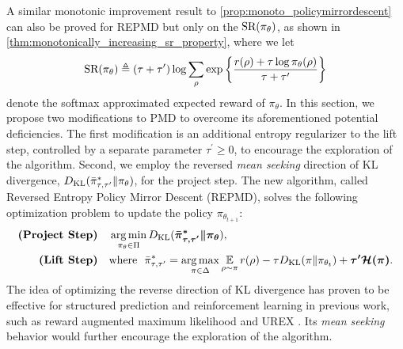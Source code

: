 A similar monotonic improvement result to \cref{prop:monoto_policymirrordescent} can also be proved for REPMD but only on the $\text{SR}(\pi_\theta) $, as shown in \cref{thm:monotonically_increasing_sr_property}, where we let
\begin{equation*}
\text{SR}(\pi_\theta) \triangleq (\tau + \tau^{\prime})\log{ \sum_{\rho}{ \exp\left\{ \frac{r(\rho) + \tau \log{\pi_\theta(\rho)} }{\tau + \tau^{\prime}} \right\} }}
\end{equation*}
denote the softmax approximated expected reward of $\pi_\theta$.
\fi
In this section, we propose two modifications to PMD to overcome its aforementioned potential deficiencies.
The first modification is an additional entropy regularizer to the lift step, controlled by a separate parameter $\tau^{\prime}\geq 0$, to encourage the exploration of the algorithm. 
Second, we employ the reversed \emph{mean seeking} direction of KL divergence, $D_{\mathrm{KL}}(\bar{\pi}_{\tau,\tau^{\prime}}^* \| \pi_\theta)$, for the project step.
The new algorithm, called Reversed Entropy Policy Mirror Descent (REPMD), solves the following optimization problem to update the policy $\pi_{\theta_{t+1}}$:
\begin{equation}
\label{eq:repmd}
\begin{split}
\text{\bf (Project Step)} \quad  &\argmin\limits_{\pi_\theta \in \Pi}{\KL(\bm{ \bar{\pi}_{\tau,\tau^{\prime}}^* \| \pi_\theta }) }, \\
\text{\bf (Lift Step)} \quad  & \text{where}\ \ \bar{\pi}_{\tau,\tau^{\prime}}^*  =  \argmax\limits_{\pi \in \Delta}{ \ep\limits_{\rho \sim \pi}{  r(\rho)  - \tau \KL(\pi \| \pi_{\theta_t}) + \bm{\tau^{\prime} \cH(\pi)} }}.
\end{split}
\end{equation}
The idea of optimizing the reverse direction of KL divergence has proven to be effective for structured prediction and reinforcement learning in previous work, such as reward augmented maximum likelihood \citep{norouzi2016reward} and UREX \citep{nachum2017improving}.
Its \emph{mean seeking} behavior would further encourage the exploration of the algorithm.

